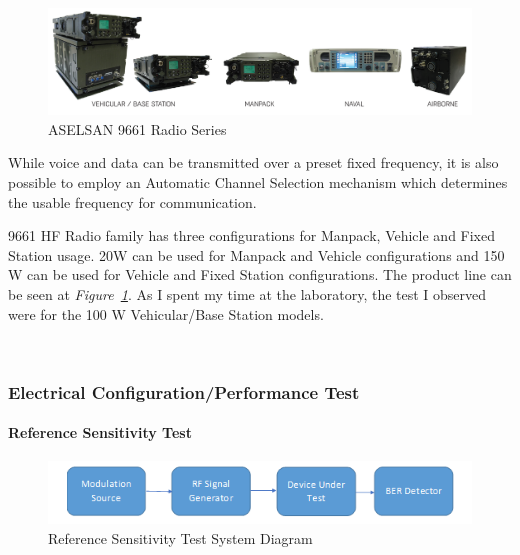 \begin{figure}[H]
	\center
	\setlength{\unitlength}{\textwidth} 
	\includegraphics[width=1.0\unitlength]{radio_type}
	\caption{\label{fig:radtyp}ASELSAN 9661 Radio Series }
\end{figure}

	 While voice and data can be transmitted over a preset fixed frequency, it is also possible to employ an Automatic Channel Selection mechanism which determines the usable frequency for communication.

	


	
	9661 HF Radio family has three configurations for Manpack, Vehicle and Fixed Station usage. 20W can be used for Manpack and Vehicle configurations and 150 W can be used for Vehicle and Fixed Station configurations. The product line can be seen at \textit{Figure~\ref{fig:radtyp}}. As I spent my time at the laboratory, the test I observed were for the 100 W Vehicular/Base Station models. 

\- \\ \- \vfill

\subsubsection{Electrical Configuration/Performance Test}
\- \indent



\paragraph{Reference Sensitivity Test}
\- \indent



\begin{figure}[H]
	\center
	\setlength{\unitlength}{\textwidth} 
	\includegraphics[width=1.0\unitlength]{refsens}
	\caption{\label{fig:refsens}Reference Sensitivity Test System Diagram }
\end{figure}

